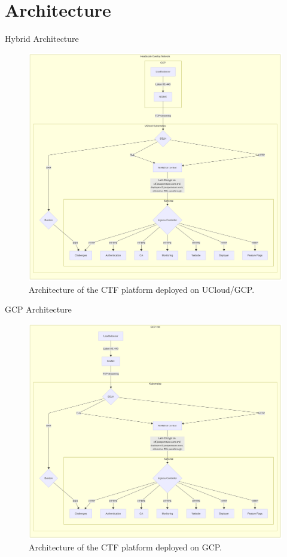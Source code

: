 \documentclass{beamer}
\begin{document}
\section{Architecture}
\begin{frame}{Hybrid Architecture}
    \begin{figure}
        \centering
        \includegraphics[width=.7\textwidth]{../report/images/ucloud-architecture.png}
        \caption{Architecture of the CTF platform deployed on UCloud/GCP.}
    \end{figure}
\end{frame}

\begin{frame}{GCP Architecture}
    \begin{figure}
        \centering
        \includegraphics[width=.7\textwidth]{./images/GCP-architecture.png}
        \caption{Architecture of the CTF platform deployed on GCP.}
    \end{figure}
\end{frame}
\end{document}
